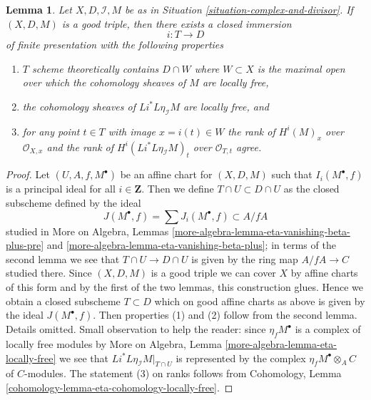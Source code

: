 \documentclass[10pt,a4paper]{amsart}
\theoremstyle{plain}
\newtheorem{lemma}[subsection]{Lemma}
\theoremstyle{definition}
\theoremstyle{remark}
\numberwithin{equation}{subsection}
\begin{document}
\begin{lemma}
\label{lemma-complex-and-divisor-blowup-good-T}
Let $X, D, \mathcal{I}, M$ be as in
Situation \ref{situation-complex-and-divisor}.
If $(X, D, M)$ is a good triple, then there exists a
closed immersion
$$
i : T \longrightarrow D
$$
of finite presentation with the following properties
\begin{enumerate}
\item $T$ scheme theoretically contains $D \cap W$
where $W \subset X$ is the maximal open over which the
cohomology sheaves of $M$ are locally free,
\item the cohomology sheaves of $Li^*L\eta_\mathcal{I}M$
are locally free, and
\item for any point $t \in T$ with image $x = i(t) \in W$ the rank
of $H^i(M)_x$ over $\mathcal{O}_{X, x}$ and the rank
of $H^i(Li^*L\eta_\mathcal{I}M)_t$ over $\mathcal{O}_{T, t}$ agree.
\end{enumerate}
\end{lemma}

\begin{proof}
Let $(U, A, f, M^\bullet)$ be an affine chart for $(X, D, M)$
such that $I_i(M^\bullet, f)$ is a principal ideal for all $i \in \mathbf{Z}$.
Then we define $T \cap U \subset D \cap U$ as the closed subscheme
defined by the ideal
$$
J(M^\bullet, f) = \sum J_i(M^\bullet, f) \subset A/fA
$$
studied in More on Algebra, Lemmas
\ref{more-algebra-lemma-eta-vanishing-beta-plus-pre} and
\ref{more-algebra-lemma-eta-vanishing-beta-plus};
in terms of the second lemma we see that $T \cap U \to D \cap U$
is given by the ring map $A/fA \to C$ studied there.
Since $(X, D, M)$ is a good triple we can cover $X$ by
affine charts of this form and by the first of the two
lemmas, this construction glues. Hence we obtain a closed
subscheme $T \subset D$ which on good affine charts as above
is given by the ideal $J(M^\bullet, f)$. Then properties
(1) and (2) follow from the second lemma. Details omitted.
Small observation to help the reader:
since $\eta_fM^\bullet$ is a complex of locally free modules
by More on Algebra, Lemma \ref{more-algebra-lemma-eta-locally-free}
we see that $Li^*L\eta_\mathcal{I}M|_{T \cap U}$
is represented by the complex $\eta_fM^\bullet \otimes_A C$
of $C$-modules. The statement (3) on ranks follows from
Cohomology, Lemma \ref{cohomology-lemma-eta-cohomology-locally-free}.
\end{proof}
\end{document}
